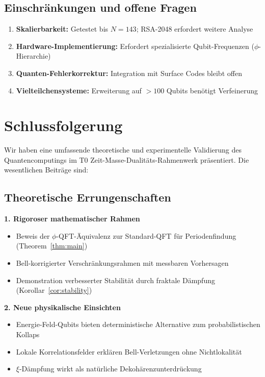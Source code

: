 \subsection{Einschränkungen und offene Fragen}

\begin{enumerate}
	\item \textbf{Skalierbarkeit:} Getestet bis $N=143$; RSA-2048 erfordert weitere Analyse
	\item \textbf{Hardware-Implementierung:} Erfordert spezialisierte Qubit-Frequenzen ($\phi$-Hierarchie)
	\item \textbf{Quanten-Fehlerkorrektur:} Integration mit Surface Codes bleibt offen
	\item \textbf{Vielteilchensysteme:} Erweiterung auf $>100$ Qubits benötigt Verfeinerung
\end{enumerate}

\section{Schlussfolgerung}

Wir haben eine umfassende theoretische und experimentelle Validierung des Quantencomputings im T0 Zeit-Masse-Dualitäts-Rahmenwerk präsentiert. Die wesentlichen Beiträge sind:

\subsection{Theoretische Errungenschaften}

\textbf{1. Rigoroser mathematischer Rahmen}
\begin{itemize}
	\item Beweis der $\phi$-QFT-Äquivalenz zur Standard-QFT für Periodenfindung (Theorem~\ref{thm:main})
	\item Bell-korrigierter Verschränkungsrahmen mit messbaren Vorhersagen
	\item Demonstration verbesserter Stabilität durch fraktale Dämpfung (Korollar~\ref{cor:stability})
\end{itemize}

\textbf{2. Neue physikalische Einsichten}
\begin{itemize}
	\item Energie-Feld-Qubits bieten deterministische Alternative zum probabilistischen Kollaps
	\item Lokale Korrelationsfelder erklären Bell-Verletzungen ohne Nichtlokalität
	\item $\xi$-Dämpfung wirkt als natürliche Dekohärenzunterdrückung
\end{itemize}

